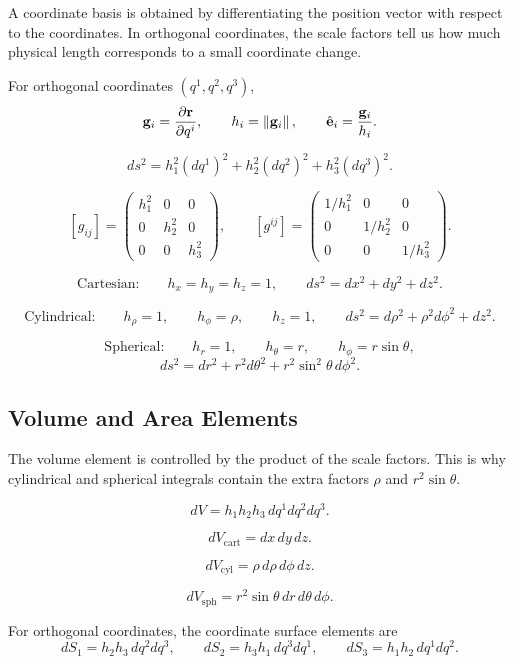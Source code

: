 \documentclass{otscience}
\begin{document}
A coordinate basis is obtained by differentiating the position vector with respect to the coordinates. In orthogonal coordinates, the scale factors tell us how much physical length corresponds to a small coordinate change.

\begin{formulabox}
    For orthogonal coordinates \((q^1,q^2,q^3)\),
    \[
        \mathbf{g}_i=\frac{\partial\mathbf{r}}{\partial q^i},
        \qquad
        h_i=\left\lVert\mathbf{g}_i\right\rVert,
        \qquad
        \hat{\mathbf{e}}_i=\frac{\mathbf{g}_i}{h_i}.
    \]

    \[
        ds^2=h_1^2{(dq^1)}^2+h_2^2{(dq^2)}^2+h_3^2{(dq^3)}^2.
    \]

    \[
        [g_{ij}]=\begin{pmatrix}
            h_1^2 & 0     & 0     \\
            0     & h_2^2 & 0     \\
            0     & 0     & h_3^2
        \end{pmatrix},
        \qquad
        [g^{ij}]=\begin{pmatrix}
            1/h_1^2 & 0       & 0       \\
            0       & 1/h_2^2 & 0       \\
            0       & 0       & 1/h_3^2
        \end{pmatrix}.
    \]

    \[
        \text{Cartesian:}\qquad h_x=h_y=h_z=1,
        \qquad ds^2=dx^2+dy^2+dz^2.
    \]

    \[
        \text{Cylindrical:}\qquad h_\rho=1,
        \qquad h_\phi=\rho,
        \qquad h_z=1,
        \qquad ds^2=d\rho^2+\rho^2d\phi^2+dz^2.
    \]

    \[
        \text{Spherical:}\qquad h_r=1,
        \qquad h_\theta=r,
        \qquad h_\phi=r\sin\theta,
    \]
    \[
        ds^2=dr^2+r^2d\theta^2+r^2\sin^2\theta\,d\phi^2.
    \]
\end{formulabox}

\subsection{Volume and Area Elements}

The volume element is controlled by the product of the scale factors. This is why cylindrical and spherical integrals contain the extra factors \(\rho\) and \(r^2\sin\theta\).

\begin{formulaboxnosplit}
    \[
        dV=h_1h_2h_3\,dq^1dq^2dq^3.
    \]

    \[
        dV_{\text{cart}}=dx\,dy\,dz.
    \]

    \[
        dV_{\text{cyl}}=\rho\,d\rho\,d\phi\,dz.
    \]

    \[
        dV_{\text{sph}}=r^2\sin\theta\,dr\,d\theta\,d\phi.
    \]

    For orthogonal coordinates, the coordinate surface elements are
    \[
        dS_1=h_2h_3\,dq^2dq^3,
        \qquad
        dS_2=h_3h_1\,dq^3dq^1,
        \qquad
        dS_3=h_1h_2\,dq^1dq^2.
    \]
\end{formulaboxnosplit}
\end{document}
